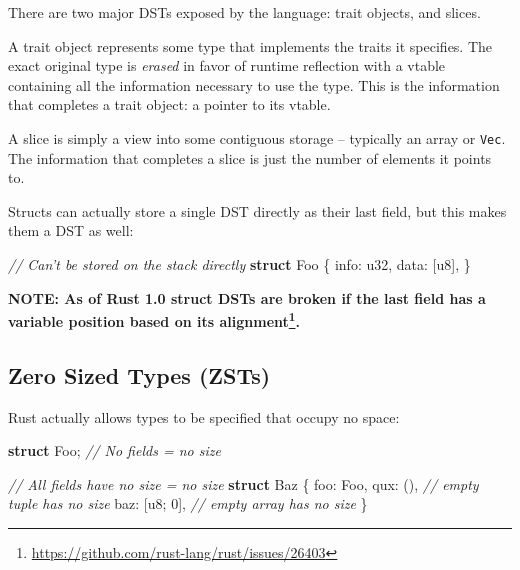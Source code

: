\documentclass[a4paper,]{book}
\newenvironment{Shaded}{\begin{snugshade}}{\end{snugshade}}
\newcommand{\KeywordTok}[1]{\textcolor[rgb]{0.13,0.29,0.53}{\textbf{{#1}}}}
\newcommand{\DataTypeTok}[1]{\textcolor[rgb]{0.13,0.29,0.53}{{#1}}}
\newcommand{\DecValTok}[1]{\textcolor[rgb]{0.00,0.00,0.81}{{#1}}}
\newcommand{\CommentTok}[1]{\textcolor[rgb]{0.56,0.35,0.01}{\textit{{#1}}}}
\newcommand{\NormalTok}[1]{{#1}}
\renewcommand{\href}[2]{#2\footnote{\url{#1}}}
\begin{document}
There are two major DSTs exposed by the language: trait objects, and
slices.

A trait object represents some type that implements the traits it
specifies. The exact original type is \emph{erased} in favor of runtime
reflection with a vtable containing all the information necessary to use
the type. This is the information that completes a trait object: a
pointer to its vtable.

A slice is simply a view into some contiguous storage -- typically an
array or \texttt{Vec}. The information that completes a slice is just
the number of elements it points to.

Structs can actually store a single DST directly as their last field,
but this makes them a DST as well:

\begin{Shaded}
\begin{Highlighting}[]
\CommentTok{// Can't be stored on the stack directly}
\KeywordTok{struct} \NormalTok{Foo \{}
    \NormalTok{info: }\DataTypeTok{u32}\NormalTok{,}
    \NormalTok{data: [}\DataTypeTok{u8}\NormalTok{],}
\NormalTok{\}}
\end{Highlighting}
\end{Shaded}

\textbf{NOTE: \href{https://github.com/rust-lang/rust/issues/26403}{As
of Rust 1.0 struct DSTs are broken if the last field has a variable
position based on its alignment}.}

\subsection{Zero Sized Types (ZSTs)}\label{zero-sized-types-zsts}

Rust actually allows types to be specified that occupy no space:

\begin{Shaded}
\begin{Highlighting}[]
\KeywordTok{struct} \NormalTok{Foo; }\CommentTok{// No fields = no size}

\CommentTok{// All fields have no size = no size}
\KeywordTok{struct} \NormalTok{Baz \{}
    \NormalTok{foo: Foo,}
    \NormalTok{qux: (),      }\CommentTok{// empty tuple has no size}
    \NormalTok{baz: [}\DataTypeTok{u8}\NormalTok{; }\DecValTok{0}\NormalTok{], }\CommentTok{// empty array has no size}
\NormalTok{\}}
\end{Highlighting}
\end{Shaded}
\end{document}
